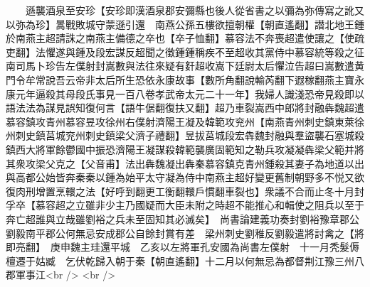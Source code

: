 　　遜襲酒泉至安珍【安珍即漢酒泉郡安彌縣也後人從省書之以彌為弥傳寫之訛又以弥為珍】暠戰敗城守蒙遜引還　南燕公孫五樓欲擅朝權【朝直遙翻】譛北地王鍾於南燕主超請誅之南燕主備德之卒也【卒子恤翻】慕容法不奔喪超遣使讓之【使疏吏翻】法懼遂與鍾及段宏謀反超聞之徵鍾鍾稱疾不至超收其黨侍中慕容統等殺之征南司馬卜珍告左僕射封嵩數與法往來疑有姧超收嵩下廷尉太后懼泣告超曰嵩數遣黄門令牟常說吾云帝非太后所生恐依永康故事【數所角翻說輸芮翻下遐稼翻燕主寶永康元年逼殺其母段氏事見一百八卷孝武帝太元二十一年】我婦人識淺恐帝見殺即以語法法為謀見誤知復何言【語牛倨翻復扶又翻】超乃車裂嵩西中郎將封融犇魏超遣慕容鎮攻青州慕容昱攻徐州右僕射濟陽王凝及韓範攻兖州【南燕青州刺史鎮東萊徐州刺史鎮莒城兖州刺史鎮梁父濟子禮翻】昱拔莒城段宏犇魏封融與羣盜襲石塞城殺鎮西大將軍餘鬱國中振恐濟陽王凝謀殺韓範襲廣固範知之勒兵攻凝凝犇梁父範并將其衆攻梁父克之【父音甫】法出犇魏凝出犇秦慕容鎮克青州鍾殺其妻子為地道以出與高都公始皆奔秦秦以鍾為始平太守凝為侍中南燕主超好變更舊制朝野多不悦又欲復肉刑增置烹轘之法【好呼到翻更工衡翻轘戶慣翻車裂也】衆議不合而止冬十月封孚卒【慕容超之立雖非少主乃國疑而大臣未附之時超不能推心和輯使之阻兵以至于奔亡超誰與立哉雖劉裕之兵未至固知其必滅矣】　尚書論建義功奏封劉裕豫章郡公劉毅南平郡公何無忌安成郡公自餘封賞有差　梁州刺史劉稚反劉毅遣將討禽之【將即亮翻】　庚申魏主珪還平城　乙亥以左將軍孔安國為尚書左僕射　十一月秃髮傉檀遷于姑臧　乞伏乾歸入朝于秦【朝直遙翻】十二月以何無忌為都督荆江豫三州八郡軍事江<br />
<br />
